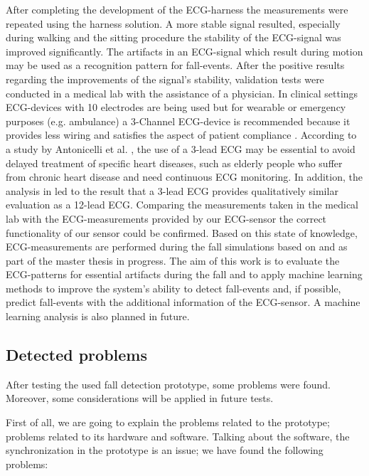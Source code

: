 \documentclass[review]{elsarticle}
\begin{document}
After completing the development of the ECG-harness the measurements were repeated using the harness solution. A more stable signal resulted, especially during walking and the sitting procedure the stability of the ECG-signal was improved significantly. The artifacts in an ECG-signal which result during motion may be used as a recognition pattern for fall-events. After the positive results regarding the improvements of the signal's stability, validation tests were conducted in a medical lab with the assistance of a physician. In clinical settings ECG-devices with 10 electrodes are being used but for wearable or emergency purposes (e.g. ambulance) a 3-Channel ECG-device is recommended because it provides less wiring and satisfies the aspect of patient compliance \cite{DrNicoletteWagner}. According to a study by Antonicelli et al. \cite{Antonicelli-ECG}, the use of a 3-lead ECG may be essential to avoid delayed treatment of specific heart diseases, such as elderly people who suffer from chronic heart disease and need continuous ECG monitoring. In addition, the analysis in \cite{Antonicelli-ECG} led to the result that a 3-lead ECG provides qualitatively similar evaluation as a 12-lead ECG. Comparing the measurements taken in the medical lab with the ECG-measurements provided by our ECG-sensor the correct functionality of our sensor could be confirmed. Based on this state of knowledge, ECG-measurements are performed during the fall simulations based on \cite{Li2009} and \cite{Pannurat2014} as part of the master thesis \cite{FatimaMasterThesis} in progress. The aim of this work is to evaluate the ECG-patterns for essential artifacts during the fall and to apply machine learning methods to improve the system's ability to detect fall-events and, if possible, predict fall-events with the additional information of the ECG-sensor. A machine learning analysis is also planned in future. 

\subsection{Detected problems}
\label{sub:detectedproblems}

After testing the used fall detection prototype, some problems were 
found. Moreover, some considerations will be applied in future tests.

First of all, we are going to explain the problems related to the prototype; problems related to its hardware and
software. Talking about the software, the synchronization in the prototype is an issue; we have found the following problems:
\end{document}
